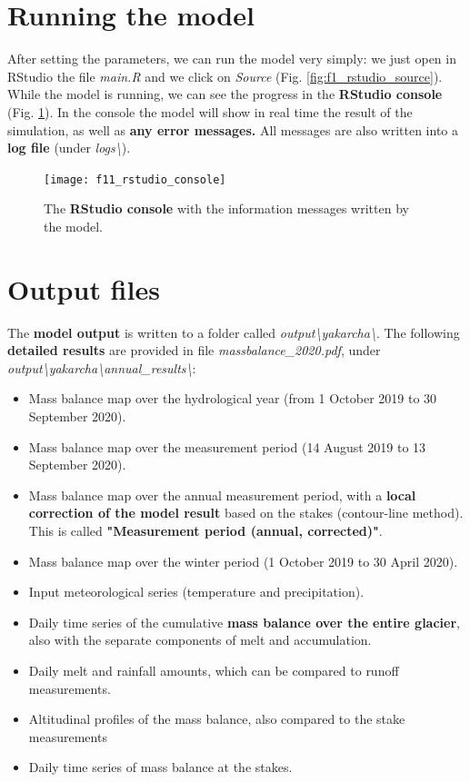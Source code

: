\documentclass[15pt]{extarticle}
\begin{document}
\section{Running the model}
After setting the parameters, we can run the model very simply: we just open in RStudio the file \textit{main.R} and we click on \textit{Source} (Fig. \ref{fig:f1_rstudio_source}). While the model is running, we can see the progress in the \textbf{RStudio console} (Fig. \ref{fig:f11_rstudio_console}). In the console the model will show in real time the result of the simulation, as well as \textbf{any error messages.} All messages are also written into a \textbf{log file} (under \textit{logs\textbackslash}).
\vspace{1.0cm}
\begin{figure}[h]
    \centering
    \texttt{[image: f11\_rstudio\_console]}
    \caption{The \textbf{RStudio console} with the information messages written by the model.}
    \label{fig:f11_rstudio_console}
\end{figure}


\clearpage
\section{Output files}
The \textbf{model output} is written to a folder called \textit{output\textbackslash yakarcha\textbackslash}. The following \textbf{detailed results} are provided in file \textit{massbalance\_2020.pdf}, under \textit{output\textbackslash yakarcha\textbackslash annual\_results\textbackslash}:

\begin{itemize}
    \item Mass balance map over the hydrological year (from 1 October 2019 to 30 September 2020).
    \item Mass balance map over the measurement period (14 August 2019 to 13 September 2020).
    \item Mass balance map over the annual measurement period, with a \textbf{local correction of the model result} based on the stakes (contour-line method). This is called \textbf{"Measurement period (annual, corrected)"}.
    \item Mass balance map over the winter period (1 October 2019 to 30 April 2020).
    \item Input meteorological series (temperature and precipitation).
    \item Daily time series of the cumulative \textbf{mass balance over the entire glacier}, also with the separate components of melt and accumulation.
    \item Daily melt and rainfall amounts, which can be compared to runoff measurements.
    \item Altitudinal profiles of the mass balance, also compared to the stake measurements
    \item Daily time series of mass balance at the stakes.
\end{itemize}
\end{document}
